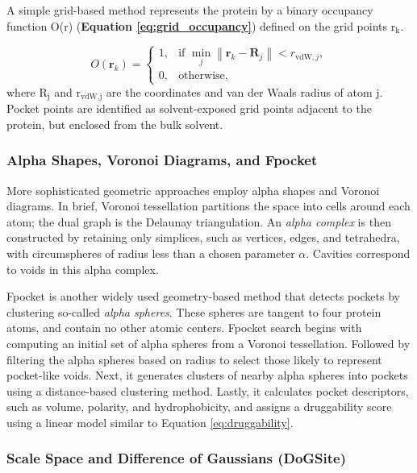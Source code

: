 \documentclass[12pt]{article}
\begin{document}
A simple grid-based method represents the protein by a binary occupancy function \textrm{O}(\textrm{r}) (\textbf{Equation \ref{eq:grid_occupancy}}) defined on the grid points $\textrm{r}_\textrm{k}$.

\begin{equation}
O(\mathbf{r}_k) =
\begin{cases}
1, & \text{if } \min_j \left\| \mathbf{r}_k - \mathbf{R}_j \right\| < r_{\mathrm{vdW},j}, \\
0, & \text{otherwise},
\end{cases}
\label{eq:grid_occupancy}
\end{equation}
where $\textrm{R}_\textrm{j}$ and $\textrm{r}_{\textrm{{vdW},j}}$ are the coordinates and van der Waals radius of atom j. Pocket points are identified as solvent-exposed grid points adjacent to the protein, but enclosed from the bulk solvent.\cite{CH5_Brylinski2008FINDSITE}

\subsubsection{Alpha Shapes, Voronoi Diagrams, and Fpocket}

More sophisticated geometric approaches employ alpha shapes\cite{CH5_tondel2002} and Voronoi diagrams\cite{CH5_crippen1987voronoi}. In brief, Voronoi tessellation partitions the space into cells around each atom; the dual graph is the Delaunay triangulation. An \emph{alpha complex} is then constructed by retaining only simplices, such as vertices, edges, and tetrahedra, with circumspheres of radius less than a chosen parameter $\alpha$. Cavities correspond to voids in this alpha complex.\cite{CH5_LeGuilloux2009}


Fpocket\cite{CH5_LeGuilloux2009} is another widely used geometry-based method that detects pockets by clustering so-called \emph{alpha spheres}. These spheres are tangent to four protein atoms, and contain no other atomic centers. Fpocket search begins with computing an initial set of alpha spheres from a Voronoi tessellation. Followed by filtering the alpha spheres based on radius to select those likely to represent pocket-like voids. Next, it generates clusters of nearby alpha spheres into pockets using a distance-based clustering method. Lastly, it calculates pocket descriptors, such as volume, polarity, and hydrophobicity, and assigns a druggability score using a linear model similar to Equation \ref{eq:druggability}.

\subsubsection{Scale Space and Difference of Gaussians (DoGSite)}
\end{document}
